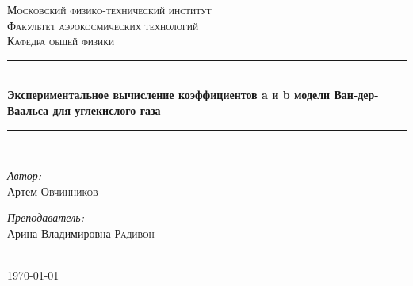 \documentclass[1 pt]{article}
\begin{document}
\begin{titlepage}
\newcommand{\HRule}{\rule{\linewidth}{0.3 mm}} %

\center %
 

\textsc{\Large Московский физико-технический институт }\\[1.5cm] %
\textsc{\Large Факультет аэрокосмических технологий}\\[0.5cm] %
\textsc{\large Кафедра общей физики}\\[0.5cm] %


\HRule \\[0.4cm]
{ \huge \bfseries Экспериментальное вычисление коэффициентов a и b модели Ван-дер-Ваальса для углекислого газа}\\[0.4cm] %
\HRule \\[1.5cm]
 

\begin{minipage}{0.4\textwidth}
\begin{flushleft} \large
\emph{Автор:}\\ Артем \textsc{Овчинников} %
\end{flushleft}
\end{minipage}
\begin{minipage}{0.4\textwidth}
\begin{flushright} \large
\emph{Преподаватель:} \\
Арина Владимировна \textsc{Радивон} %
\end{flushright}
\end{minipage}\\[4cm]

{\large \today}\\[2cm] %


 

\vfill %

\end{titlepage}
\end{document}
